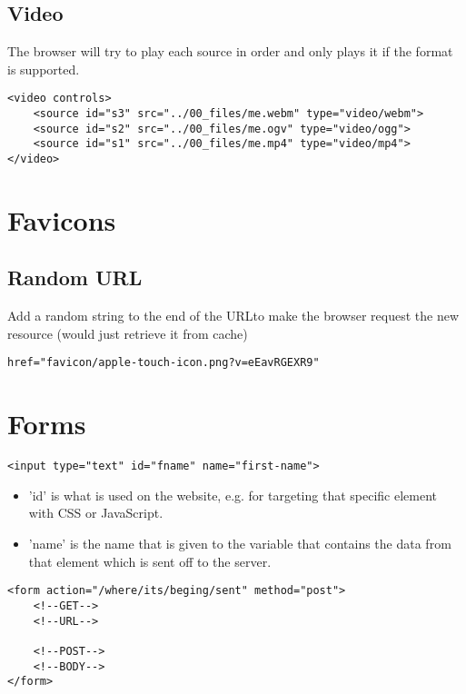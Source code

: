 \documentclass[]{article}
\newcommand{\<}{\guilsinglleft}
\renewcommand{\>}{\guilsinglright}
\begin{document}
\subsection{Video}
The browser will try to play each source in order and only plays it if the format is supported.
\begin{lstlisting}
<video controls>
	<source id="s3" src="../00_files/me.webm" type="video/webm">
	<source id="s2" src="../00_files/me.ogv" type="video/ogg">
	<source id="s1" src="../00_files/me.mp4" type="video/mp4">
</video>
\end{lstlisting}



\section{Favicons}

\subsection{Random URL}
Add a random string to the end of the URLto make the browser request the new resource (would just retrieve it from cache)
\begin{lstlisting}
href="favicon/apple-touch-icon.png?v=eEavRGEXR9"
\end{lstlisting}

\section{Forms}
\begin{lstlisting}
<input type="text" id="fname" name="first-name">
\end{lstlisting}
\begin{itemize}
	\item 'id' is what is used on the website, e.g. for targeting that specific element with CSS or JavaScript.
	\item 'name' is the name that is given to the variable that contains the data from that element which is sent off to the server.
\end{itemize}

\begin{lstlisting}
<form action="/where/its/beging/sent" method="post">
	<!--GET-->
	<!--URL-->
	
	<!--POST-->
	<!--BODY-->
</form>
\end{lstlisting}
\end{document}
